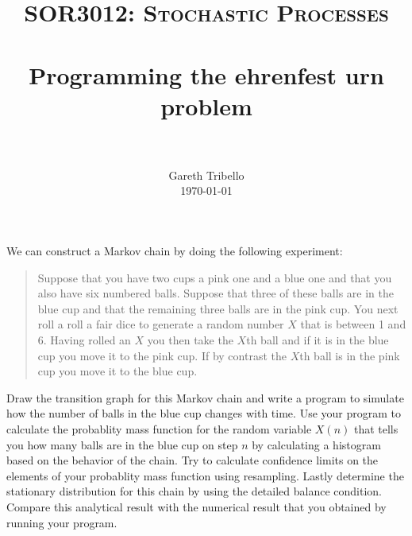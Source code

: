 \documentclass[paper=a4, fontsize=11pt]{scrartcl}
\title{\usefont{OT1}{bch}{b}{n} \normalfont \normalsize \textsc{SOR3012:
Stochastic Processes} \\ [25pt] \horrule{0.5pt} \\[0.4cm] 
\huge Programming the ehrenfest urn problem \\
\horrule{2pt} \\[0.25cm]
}
\author{ \normalfont
\normalsize
        Gareth Tribello \\[-3pt] \normalsize
        \today
}
\date{}
\numberwithin{equation}{section}
\numberwithin{figure}{section}
\numberwithin{table}{section}
\begin{document}
\maketitle

We can construct a Markov chain by doing the following experiment:

\begin{quotation}
Suppose that you have two cups a pink one and a blue one and that you also have six numbered balls.  Suppose that three of these balls are in the blue cup and that
the remaining three balls are in the pink cup.  You next roll a roll a fair dice to generate a random number $X$ that is between 1 and 6.  Having rolled an $X$ you then
take the $X$th ball and if it is in the blue cup you move it to the pink cup.  If by contrast the $X$th ball is in the pink cup you move it to the blue cup.
\end{quotation}

Draw the transition graph for this Markov chain and write a program to simulate how the number of balls in the blue cup changes with time.  Use your program to calculate
the probablity mass function for the random variable $X(n)$ that tells you how many balls are in the blue cup on step $n$ by calculating a histogram based on the behavior 
of the chain.  Try to calculate confidence limits on the elements of your probablity mass function using resampling. Lastly determine the stationary distribution for this chain 
by using the detailed balance condition.  Compare this analytical result with the numerical result that you obtained by running your program.  
\end{document}
